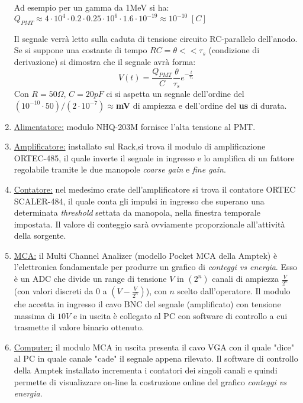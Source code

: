 \documentclass[12pt,a4paper,openright,twoside]{article}
\numberwithin{equation}{section} %
\begin{document}
\begin{enumerate}
 Ad esempio per un gamma da 1MeV si ha:
 $Q_{PMT} \approx 4 \cdot 10^4 \cdot 0.2 \cdot 0.25 \cdot 10^6 \cdot 1.6 \cdot 10^{-19} \approx 10^{-10} \; [C]$

Il segnale verrà letto sulla caduta di tensione circuito RC-parallelo dell'anodo. Se si suppone una costante di tempo $RC=\theta << \tau_{s}$ (condizione di derivazione) si dimostra che il segnale avrà forma:
\begin{equation}
V(t)=\frac{Q_{PMT}}{C} \frac{\theta}{\tau_{s}} e^{- \frac{t}{\tau_{s}}}
\end{equation}
Con $R=50 \Omega$, $C=20 pF$ ci si aspetta un segnale dell'ordine del $(10^{-10} \cdot 50) /(2 \cdot 10^{-7}) \approx $\textbf{mV} di ampiezza e dell'ordine del \textbf{ us} di durata.

\item \underline{Alimentatore:} modulo NHQ-203M fornisce l'alta tensione al PMT.
\item \underline{Amplificatore:} installato sul Rack,si trova il modulo di amplificazione ORTEC-485, il quale inverte il segnale in ingresso e lo amplifica di un fattore regolabile tramite le due manopole  \textit{coarse gain} e \textit{fine gain}. 

\item \underline{Contatore:} nel medesimo crate dell'amplificatore si trova il contatore ORTEC SCALER-484, il quale conta gli impulsi in ingresso che superano una determinata \textit{threshold} settata da manopola, nella finestra temporale impostata. Il valore di conteggio sarà ovviamente proporzionale all'attività della sorgente.

\item \underline{MCA:} il Multi Channel Analizer (modello Pocket MCA della Amptek) è l'elettronica fondamentale per produrre un grafico di \textit{conteggi vs energia}. Esso è un ADC che divide un range di tensione $V$ in $(2^n)$ canali di ampiezza $\frac{V}{2^n}$ (con valori discreti da $0$ a $\left( V-\frac{V}{2^n} \right)$), con $n$ scelto dall'operatore.  Il modulo che accetta in ingresso il cavo BNC del segnale (amplificato) con tensione massima di $10V$ e in uscita è collegato al PC con software di controllo a cui trasmette il valore binario ottenuto.

\item \underline{Computer:} il modulo MCA in uscita presenta il cavo VGA con il quale "dice" al PC in quale canale "cade" 
 il segnale appena rilevato. Il software di controllo della Amptek installato incrementa i contatori dei singoli canali e quindi permette di visualizzare on-line la costruzione online del grafico \textit{conteggi vs energia}.


\end{enumerate}
\end{document}
